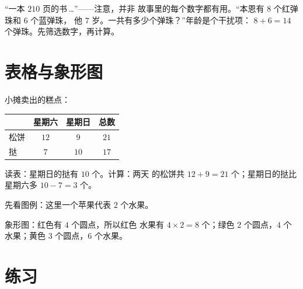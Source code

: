 \begin{example}[隐藏的多余数字]\label{ex:g2:problems:extra}
“一本 $210$ 页的书\,\dots”——注意，并非
故事里的每个数字都有用。“本恩有 $8$ 个红弹珠和 $6$ 个蓝弹珠，
他 $7$ 岁。一共有多少个弹珠？”年龄是个干扰项：
$8 + 6 = 14$ 个弹珠。先筛选数字，再计算。
\end{example}

\section{表格与象形图}

\begin{example}[表格]\label{ex:g2:problems:table}
小摊卖出的糕点：
\begin{center}
\renewcommand{\arraystretch}{1.3}
\begin{tabular}{l|ccc}
 & 星期六 & 星期日 & 总数 \\
\hline
松饼 & $12$ & $9$ & $21$ \\
挞 & $7$ & $10$ & $17$ \\
\end{tabular}
\end{center}
读表：星期日的挞有 $10$ 个。计算：两天
的松饼共 $12 + 9 = 21$ 个；星期日的挞比星期六多 $10 - 7 = 3$ 个。
\end{example}

\begin{example}[象形图]\label{ex:g2:problems:pictogram}
先看图例：这里一个苹果代表 $2$ 个水果。

\begin{omfigure}

{\small 象形图：红色有 $4$ 个圆点，所以红色
水果有 $4 \times 2 = 8$ 个；绿色 $2$ 个圆点，$4$ 个水果；黄色 $3$ 个圆点，$6$ 个水果。}
\end{omfigure}
\end{example}

\section{练习}

